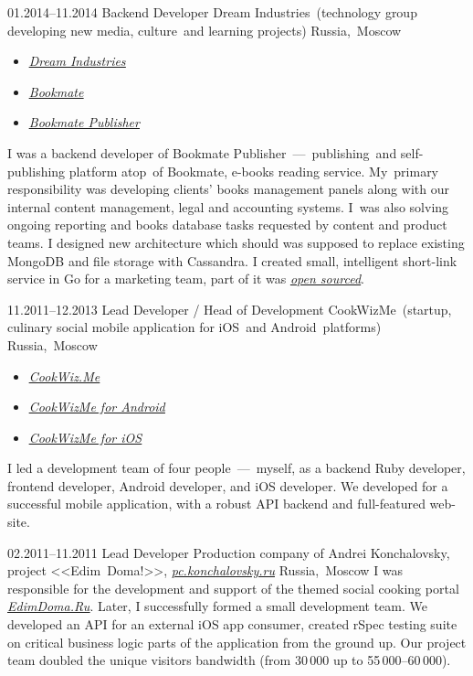 \documentclass[12pt,a4paper,oneside,final]{moderncv}
\begin{document}
\cventry
{01.2014--11.2014}
{Backend Developer}
{Dream Industries~(technology group developing new media, culture~and learning projects)}
{Russia,~Moscow}
{}
{
  \begin{itemize}
    \item \underline{\href{http://dreamindustries.co/}{\itshape Dream Industries}}
    \item \underline{\href{http://bookmate.com/}{\itshape Bookmate}}
    \item \underline{\href{http://publisher.bookmate.com/}{\itshape Bookmate Publisher}}
  \end{itemize}
  \smallskip
  I was a backend developer of Bookmate Publisher~---~publishing~and self-publishing platform atop~of Bookmate, e-books reading service. My~primary responsibility was developing clients' books management panels along with our internal content management, legal and accounting systems. I~was also solving ongoing reporting and books database tasks requested by content and product teams. I designed new architecture which should was supposed to replace existing MongoDB and file storage with Cassandra. I created small, intelligent short-link service in Go for a marketing team, part of it was \underline{\href{https://github.com/kavu/cappa}{\itshape open sourced}}.
}


\cventry
{11.2011--12.2013}
{Lead Developer / Head of Development}
{CookWizMe~(startup, culinary social mobile application for iOS~and Android~platforms)}
{Russia,~Moscow}{}
{
  \begin{itemize}
    \item \underline{\href{https://cookwiz.me/}{\itshape CookWiz.Me}}
    \item \underline{\href{https://play.google.com/store/apps/details?id=com.cookwizme}{\itshape CookWizMe for Android}}
    \item \underline{\href{https://itunes.apple.com/app/id605764643}{\itshape CookWizMe for iOS}}
  \end{itemize}
  I led a development team of four people~—~myself, as a backend Ruby developer, frontend developer, Android developer, and iOS developer. We developed for a successful mobile application, with a robust API backend and full-featured web-site.
}


\cventry
{02.2011--11.2011}
{Lead Developer}
{
  Production company of Andrei Konchalovsky, project <<Edim~Doma!>>, \underline{\href{http://pc.konchalovsky.ru}{\itshape pc.konchalovsky.ru}}
}
{Russia,~Moscow}
{}
{
  I was responsible for the development and support of the themed social cooking portal \underline{\href{http://www.edimdoma.ru}{\itshape EdimDoma.Ru}}. Later, I successfully formed a small development team. We developed an API for an external iOS app consumer, created rSpec testing suite on critical business logic parts of the application from the ground up. Our project team doubled the unique visitors bandwidth (from 30\,000 up to 55\,000--60\,000).
}
\end{document}
